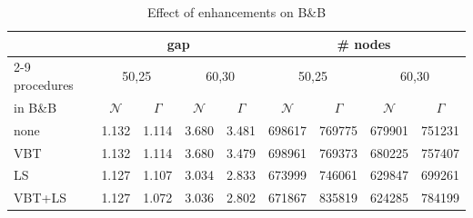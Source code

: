 \documentclass[smallextended]{svjour3hack}       %
\begin{document}
\begin{table}[!ht]
\centering
\begin{tabular}{l|rrrr|rrrr}
           & \multicolumn{4}{c|}{gap}                                                                                                                  & \multicolumn{4}{c}{\# nodes}                                                                                                             \\ \cline{2-9} 
procedures & \multicolumn{2}{c|}{50,25}                                          & \multicolumn{2}{c|}{60,30}                                          & \multicolumn{2}{c|}{50,25}                                          & \multicolumn{2}{c}{60,30}                                          \\
in B\&B    & \multicolumn{1}{c}{$\mathcal{N}$} & \multicolumn{1}{c|}{${\Gamma}$} & \multicolumn{1}{c}{$\mathcal{N}$} & \multicolumn{1}{c|}{${\Gamma}$} & \multicolumn{1}{c}{$\mathcal{N}$} & \multicolumn{1}{c|}{${\Gamma}$} & \multicolumn{1}{c}{$\mathcal{N}$} & \multicolumn{1}{c}{${\Gamma}$} \\ \hline
none       & 1.132                             & \multicolumn{1}{r|}{1.114}      & 3.680                             & 3.481                           & 698617                            & \multicolumn{1}{r|}{769775}     & 679901                            & 751231                         \\
VBT        & 1.132                             & \multicolumn{1}{r|}{1.114}      & 3.680                             & 3.479                           & 698961                            & \multicolumn{1}{r|}{769373}     & 680225                            & 757407                         \\
LS         & 1.127                             & \multicolumn{1}{r|}{1.107}      & 3.034                             & 2.833                           & 673999                            & \multicolumn{1}{r|}{746061}     & 629847                            & 699261                         \\
VBT+LS     & 1.127                             & \multicolumn{1}{r|}{1.072}      & 3.036                             & 2.802                           & 671867                            & \multicolumn{1}{r|}{835819}     & 624285                            & 784199                        
\end{tabular}
\caption{Effect of enhancements on B\&B}
\label{tab:feature_bin}
\end{table}
\end{document}
